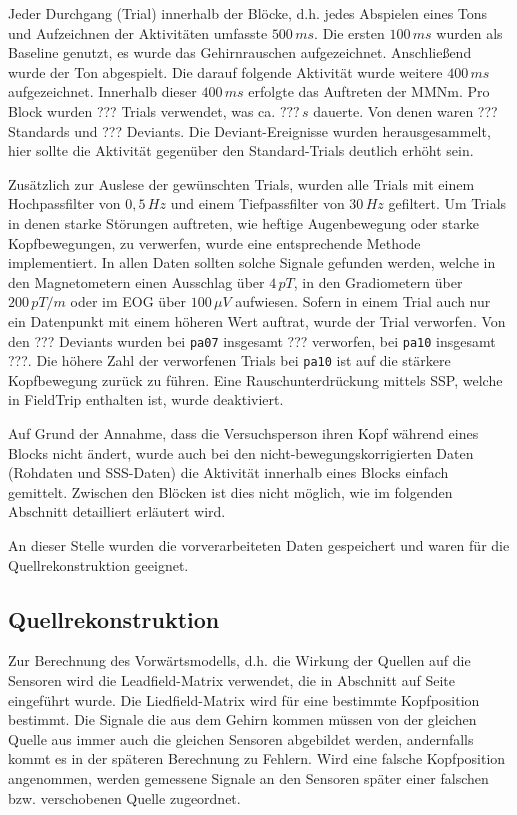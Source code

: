 \documentclass[doc,a4paper,12pt]{apa6}
\makeatletter
\DeclareRobustCommand*{\nameref}[1]{%
      \glqq{\myorg@nameref{#1}}\grqq%
    }%
\makeatother
\begin{document}
Jeder Durchgang (Trial) innerhalb der Blöcke, d.h. jedes Abspielen eines Tons und Aufzeichnen der Aktivitäten umfasste $500\,ms$. Die ersten $100\,ms$ wurden als Baseline genutzt, es wurde das Gehirnrauschen aufgezeichnet. Anschließend wurde der Ton abgespielt. Die darauf folgende Aktivität wurde weitere $400\,ms$ aufgezeichnet. Innerhalb dieser $400\,ms$ erfolgte das Auftreten der MMNm. Pro Block wurden ??? Trials verwendet, was ca. $???\,s$ dauerte. Von denen waren ??? Standards und ??? Deviants. Die Deviant-Ereignisse wurden herausgesammelt, hier sollte die Aktivität gegenüber den Standard-Trials deutlich erhöht sein.


Zusätzlich zur Auslese der gewünschten Trials, wurden alle Trials mit einem Hochpassfilter von $0,5\,Hz$ und einem Tiefpassfilter von $30\,Hz$ gefiltert. Um Trials in denen starke Störungen auftreten, wie heftige Augenbewegung oder starke Kopfbewegungen, zu verwerfen, wurde eine entsprechende Methode implementiert. In allen Daten sollten solche Signale gefunden werden, welche in den Magnetometern einen Ausschlag über $4\,pT$, in den Gradiometern über $200\,pT/m$ oder im EOG über $100\,\mu V$ aufwiesen. Sofern in einem Trial auch nur ein Datenpunkt mit einem höheren Wert auftrat, wurde der Trial verworfen. Von den ??? Deviants wurden bei \texttt{pa07} insgesamt ??? verworfen, bei \texttt{pa10} insgesamt ???. Die höhere Zahl der verworfenen Trials bei \texttt{pa10} ist auf die stärkere Kopfbewegung zurück zu führen. Eine Rauschunterdrückung mittels SSP, welche in FieldTrip enthalten ist, wurde deaktiviert.


Auf Grund der Annahme, dass die Versuchsperson ihren Kopf während eines Blocks nicht ändert, wurde auch bei den nicht-bewegungskorrigierten Daten (Rohdaten und SSS-Daten) die Aktivität innerhalb eines Blocks einfach gemittelt. Zwischen den Blöcken ist dies nicht möglich, wie im folgenden Abschnitt detailliert erläutert wird.

An dieser Stelle wurden die vorverarbeiteten Daten gespeichert und waren für die Quellrekonstruktion geeignet.

\subsection{Quellrekonstruktion}
\label{sec:lead-beam-mne}

Zur Berechnung des Vorwärtsmodells, d.h. die Wirkung der Quellen auf die Sensoren wird die Leadfield-Matrix verwendet, die in Abschnitt \nameref{sec:lead} auf Seite \pageref{sec:lead} eingeführt wurde. Die Liedfield-Matrix wird für eine bestimmte Kopfposition bestimmt. Die Signale die aus dem Gehirn kommen müssen von der gleichen Quelle aus immer auch die gleichen Sensoren abgebildet werden, andernfalls kommt es in der späteren Berechnung zu Fehlern. Wird eine falsche Kopfposition angenommen, werden gemessene Signale an den Sensoren später einer falschen bzw. verschobenen Quelle zugeordnet.
\end{document}
